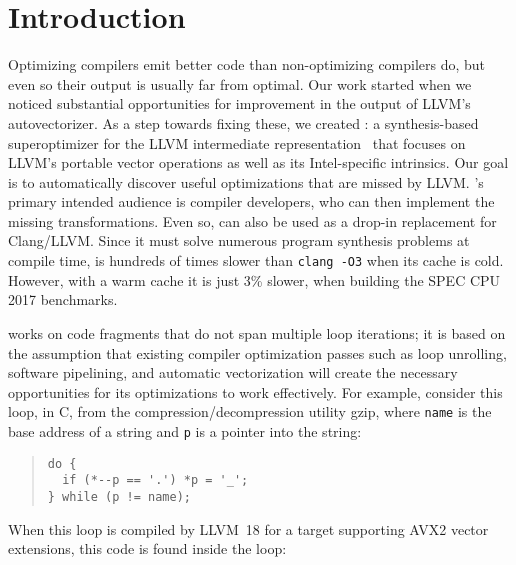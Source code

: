 \section{Introduction}

Optimizing compilers emit better code than non-optimizing compilers
do, but even so their output is usually far from optimal.
%
Our work started when we noticed substantial opportunities for
improvement in the output of LLVM's autovectorizer.
%
As a step towards fixing these, we created \minotaur{}: a synthesis-based
superoptimizer for the LLVM intermediate
representation~\cite{LLVM:CGO04} that focuses on LLVM's portable
vector operations as well as its Intel-specific intrinsics.
%
Our goal is to automatically discover useful optimizations that are
missed by LLVM\@.
%
\minotaur's primary intended audience is compiler developers, who can then
implement the missing transformations.
%
Even so, \minotaur{} can also be used as a drop-in replacement for
Clang/LLVM\@.
%
Since it must solve numerous program synthesis problems at compile
time, \minotaur{} is hundreds of times slower than \texttt{clang -O3}
when its cache is cold.
%
However, with a warm cache it is just 3\% slower, when building the
SPEC CPU 2017 benchmarks.


\minotaur{} works on code fragments that do not span multiple loop
iterations; it is based on the assumption that existing compiler
optimization passes such as loop unrolling, software pipelining, and
automatic vectorization will create the necessary opportunities for
its optimizations to work effectively.
%
For example, consider this loop, in C, from the
compression/decompression utility gzip, where \texttt{name} is the
base address of a string and \texttt{p} is a pointer into the string:

\iffalse
\begin{verbatim}
void make_simple_name(char *name) {
  char *p = strrchr(name, '.');
  if (p == NULL) return;
  if (p == name) p++;
  do {
      if (*--p == '.') *p = '_';
  } while (p != name);
}
\end{verbatim}
\fi

{\small\begin{quote}
\begin{verbatim}
do {
  if (*--p == '.') *p = '_';
} while (p != name);
\end{verbatim}
\end{quote}}

When this loop is compiled by LLVM~18 for a target supporting AVX2
vector extensions, this code is found inside the loop:

